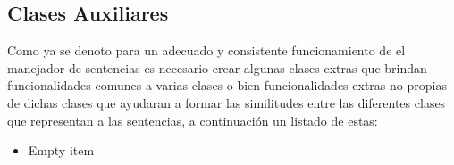 \subsection{Clases Auxiliares} \label{seccion:disenio:clases-auxiliares}
Como ya se denoto para un adecuado y consistente funcionamiento de el manejador de sentencias es necesario crear algunas clases extras que brindan funcionalidades comunes a varias clases o bien funcionalidades extras no propias de dichas clases que ayudaran a formar las similitudes entre las diferentes clases que representan a las sentencias, a continuación un listado de estas:

\begin{itemize}
\item Empty item
\end{itemize}


